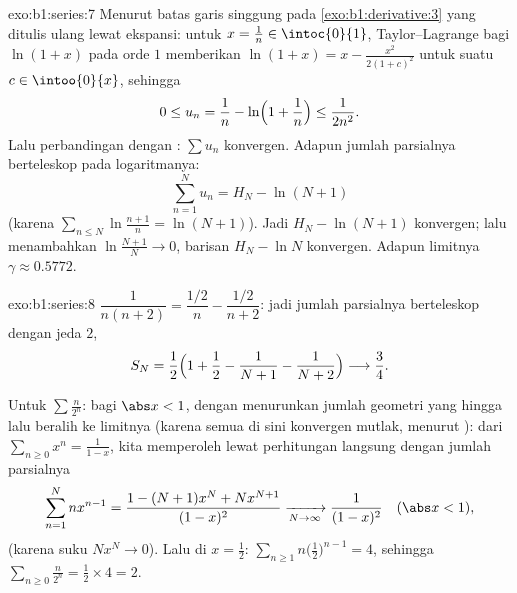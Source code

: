\begin{solution}{exo:b1:series:7}
Menurut batas garis singgung pada \cref{exo:b1:derivative:3} yang ditulis ulang
lewat ekspansi: untuk $x = \frac1n \in \intoc{0}{1}$, Taylor--Lagrange
bagi $\ln(1+x)$ pada orde $1$ memberikan $\ln(1 + x) = x - \frac{x^2}{2(1 +
c)^2}$ untuk suatu $c \in \intoo{0}{x}$, sehingga
\[
0 \leq u_n = \frac1n - \ln\Bigl(1 + \frac1n\Bigr) \leq
\frac{1}{2n^2} .
\]
Lalu perbandingan dengan : $\sum u_n$ konvergen. Adapun jumlah
parsialnya berteleskop pada logaritmanya:
\[
\sum_{n=1}^{N} u_n = H_N - \ln(N+1)
\]
(karena $\sum_{n\leq N} \ln\frac{n+1}{n} = \ln(N+1)$). Jadi $H_N -
\ln(N+1)$ konvergen; lalu menambahkan $\ln\frac{N+1}{N} \to 0$, barisan
$H_N - \ln N$ konvergen. Adapun limitnya $\gamma \approx 0.5772$.
\end{solution}

\begin{solution}{exo:b1:series:8}
$\dfrac{1}{n(n+2)} = \dfrac{1/2}{n} - \dfrac{1/2}{n+2}$: jadi jumlah
parsialnya berteleskop dengan jeda $2$,
\[
S_N = \frac12\Bigl(1 + \frac12 - \frac{1}{N+1} -
\frac{1}{N+2}\Bigr) \longrightarrow \frac34 .
\]

Untuk $\sum \frac{n}{2^n}$: bagi $\abs x < 1$, dengan menurunkan jumlah
geometri yang hingga lalu beralih ke limitnya (karena semua  di sini konvergen
mutlak, menurut ): dari $\sum_{n\geq0} x^n = \frac{1}{1-x}$,
kita memperoleh lewat perhitungan langsung dengan jumlah parsialnya
\[
\sum_{n=1}^{N} n x^{n-1}
= \frac{1 - (N+1)x^N + N x^{N+1}}{(1 - x)^2}
\xrightarrow[N\to\infty]{} \frac{1}{(1-x)^2}
\quad (\abs x < 1),
\]
(karena suku  $N x^N \to 0$). Lalu di $x = \frac12$:
$\sum_{n\geq1} n\bigl(\frac12\bigr)^{n-1} = 4$, sehingga $\sum_{n\geq0}
\frac{n}{2^n} = \frac12 \times 4 = 2$.
\end{solution}

